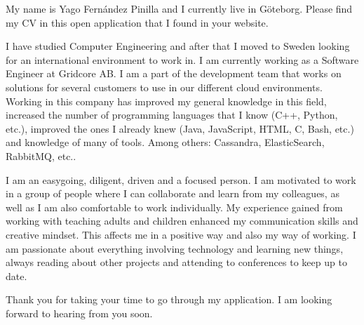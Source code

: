 \documentclass[11pt,a4paper,sans]{moderncv}        %
\begin{document}
My name is Yago Fernández Pinilla and I currently live in Göteborg. Please find my CV in this open application that I found in your website.

I have studied Computer Engineering and after that I moved to Sweden looking for an international environment to work in. I am currently working as a Software Engineer at Gridcore AB. I am a part of the development team that works on solutions for several customers to use in our different cloud environments. Working in this company has improved my general knowledge in this field, increased the number of programming languages that I know (C++, Python, etc.), improved the ones I already knew (Java, JavaScript, HTML, C, Bash, etc.) and knowledge of many of tools. Among others: Cassandra, ElasticSearch, RabbitMQ, etc..

I am an easygoing, diligent, driven and a focused person. I am motivated to work in a group of people where I can collaborate and learn from my colleagues, as well as I am also comfortable to work individually. My experience gained from working with teaching adults and children enhanced my communication skills and creative mindset. This affects me in a positive way and also my way of working. I am passionate about everything involving technology and learning new things, always reading about other projects and attending to conferences to keep up to date. 

Thank you for taking your time to go through my application. I am looking forward to hearing from you soon.


\makeletterclosing

\end{document}
